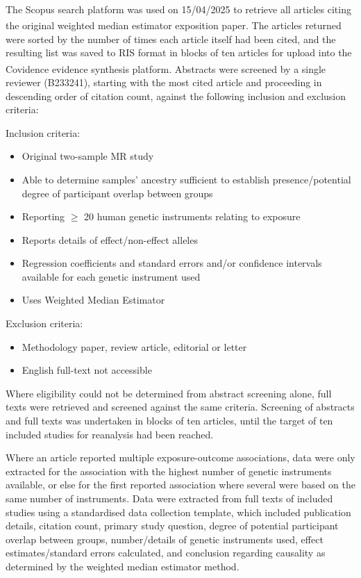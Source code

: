 \documentclass[
]{article}
\begin{document}
The Scopus search platform\textsuperscript{} was used on 15/04/2025 to retrieve all articles citing the original weighted median estimator exposition paper\textsuperscript{}. The articles returned were sorted by the number of times each article itself had been cited, and the resulting list was saved to RIS format in blocks of ten articles for upload into the Covidence evidence synthesis platform\textsuperscript{}. Abstracts were screened by a single reviewer (B233241), starting with the most cited article and proceeding in descending order of citation count, against the following inclusion and exclusion criteria:

Inclusion criteria:

\begin{itemize}
\item
  Original two-sample MR study
\item
  Able to determine samples' ancestry sufficient to establish presence/potential degree of participant overlap between groups
\item
  Reporting \(\ge\) 20 human genetic instruments relating to exposure
\item
  Reports details of effect/non-effect alleles
\item
  Regression coefficients and standard errors and/or confidence intervals available for each genetic instrument used
\item
  Uses Weighted Median Estimator
\end{itemize}

Exclusion criteria:

\begin{itemize}
\item
  Methodology paper, review article, editorial or letter
\item
  English full-text not accessible
\end{itemize}

Where eligibility could not be determined from abstract screening alone, full texts were retrieved and screened against the same criteria. Screening of abstracts and full texts was undertaken in blocks of ten articles, until the target of ten included studies for reanalysis had been reached.

Where an article reported multiple exposure-outcome associations, data were only extracted for the association with the highest number of genetic instruments available, or else for the first reported association where several were based on the same number of instruments. Data were extracted from full texts of included studies using a standardised data collection template, which included publication details, citation count, primary study question, degree of potential participant overlap between groups, number/details of genetic instruments used, effect estimates/standard errors calculated, and conclusion regarding causality as determined by the weighted median estimator method.
\end{document}
